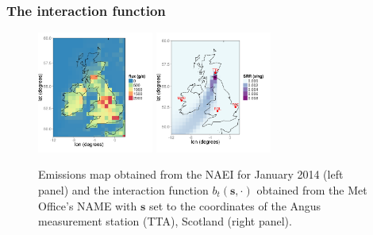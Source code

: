 \documentclass{beamer}
\newcommand{\s}{\mathbf{s}}
\begin{document}
\begin{frame}
\frametitle{The interaction function}

\vfill
\begin{center}
\begin{figure}
\includegraphics[width=1.5in]{NAEI.png}
\includegraphics[width=1.5in]{TTA_01_01.png}
\caption{Emissions map obtained from the NAEI for January 2014 (left panel) and the interaction function $b_t(\s,\cdot)$ obtained from the Met Office's NAME  with $\s$ set to the coordinates of the Angus measurement station (\textsc{TTA}), Scotland (right panel).}
\end{figure}
\vfill
\end{center}
\end{frame}


\end{document}
